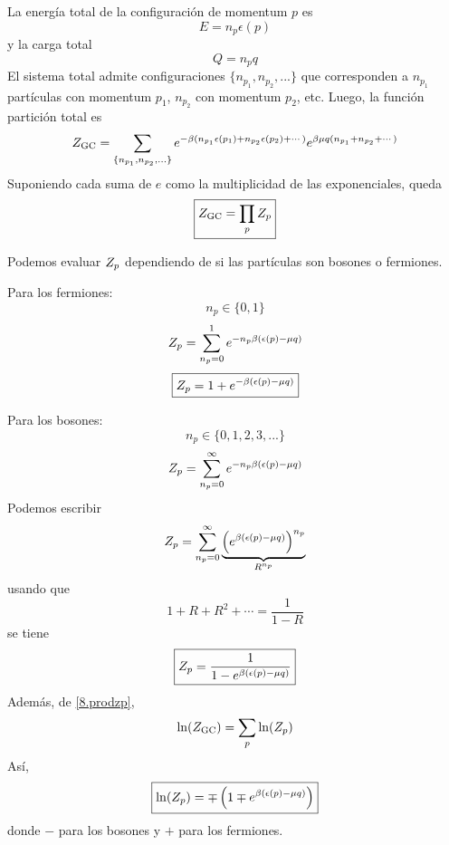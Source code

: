 La energía total de la configuración de momentum $p$ es
\begin{equation}
  E=n_p \epsilon(p)
\end{equation}
y la carga total
\begin{equation}
  Q=n_pq
\end{equation}
El sistema total admite configuraciones $\{n_{p_1},n_{p_2},...\}$ que corresponden a $n_{p_1}$ partículas con momentum $p_1$, $n_{p_2}$ con momentum $p_2$, etc. Luego, la función partición total es
\begin{equation}
  Z_{\rm GC} =\sum_{\{n_{p_1},n_{p_2},...\}}e^{-\beta (n_{p_1}\epsilon(p_1)+n_{p_2}\epsilon(p_2)+\cdots)}e^{\beta\mu q(n_{p_1}+n_{p_2}+\cdots)}
\end{equation}
Suponiendo cada suma de $e$ como la multiplicidad de las exponenciales, queda
\begin{equation}\label{8.prodzp}
  \boxed{Z_{\rm GC} =\prod_p Z_{p}}
\end{equation}

Podemos evaluar $Z_{p}$ dependiendo de si las partículas son bosones o fermiones.

Para los fermiones:
\begin{equation}
  n_p\in \{0,1\}
\end{equation}
\begin{equation}
  Z_{p}=\sum_{n_p=0}^1e^{-n_p\beta (\epsilon(p)-\mu q)}
\end{equation}
\begin{equation}
 \boxed{ Z_{p}=1+e^{-\beta (\epsilon(p)-\mu q)}}
\end{equation}

Para los bosones:
\begin{equation}
   n_p\in \{0,1,2,3,...\}
\end{equation}
\begin{equation}
  Z_{p}=\sum_{n_p=0}^\infty e^{-n_p\beta (\epsilon(p)-\mu q)}
\end{equation}
Podemos escribir
\begin{equation}
  Z_{p} =\sum_{n_p=0}^\infty \underbrace{\left(e^{\beta (\epsilon(p)-\mu q)}\right)^{n_p}}_{R^{n_p}}
\end{equation}
usando que
\begin{equation}
  1+R+R^2+\cdots =\frac{1}{1-R}
\end{equation}
se tiene
\begin{equation}
  \boxed{Z_{p}=\frac{1}{1-e^{\beta (\epsilon(p)-\mu q)}}}
\end{equation}
Además, de \eqref{8.prodzp}, 
\begin{equation}
  \ln(Z_{\rm GC})=\sum_p\ln(Z_{p})
\end{equation}
Así,
\begin{equation}
  \boxed{\ln(Z_{p})=\mp \left(1\mp e^{\beta (\epsilon(p)-\mu q)}\right)}
\end{equation}
donde $-$ para los bosones y $+$ para los fermiones.

